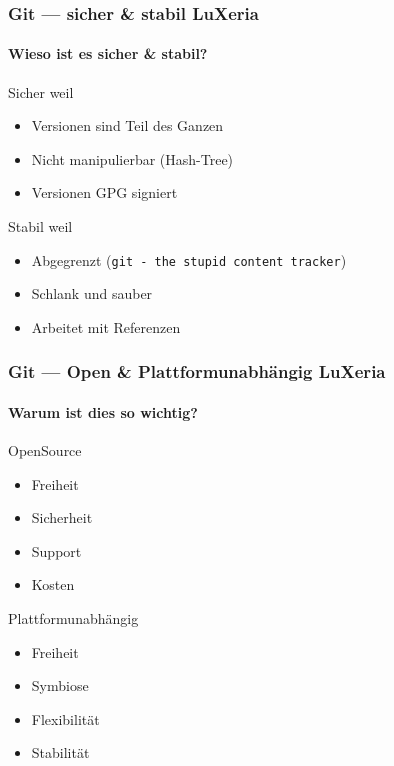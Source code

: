 \begin{frame}
    \frametitle{Git --- sicher \& stabil \hfill{} LuXeria}
    \framesubtitle{Wieso ist es sicher \& stabil?}
    \begin{block}{Sicher weil}
        \begin{itemize}
            \item Versionen sind Teil des Ganzen
            \item Nicht manipulierbar (Hash-Tree)
            \item Versionen GPG signiert
        \end{itemize}
    \end{block}
    \begin{block}{Stabil weil}
        \begin{itemize}
            \item Abgegrenzt (\lstinline$git - the stupid content tracker$)
            \item Schlank und sauber
            \item Arbeitet mit Referenzen
        \end{itemize}
    \end{block}
\end{frame}

\begin{frame}
    \frametitle{Git --- Open \& Plattformunabhängig \hfill{} LuXeria}
    \framesubtitle{Warum ist dies so wichtig?}
    \begin{block}{OpenSource}
        \begin{itemize}
            \item Freiheit
            \item Sicherheit
            \item Support
            \item Kosten
        \end{itemize}
    \end{block}
    \begin{block}{Plattformunabhängig}
        \begin{itemize}
            \item Freiheit
            \item Symbiose
            \item Flexibilität
            \item Stabilität
        \end{itemize}
    \end{block}
\end{frame}

